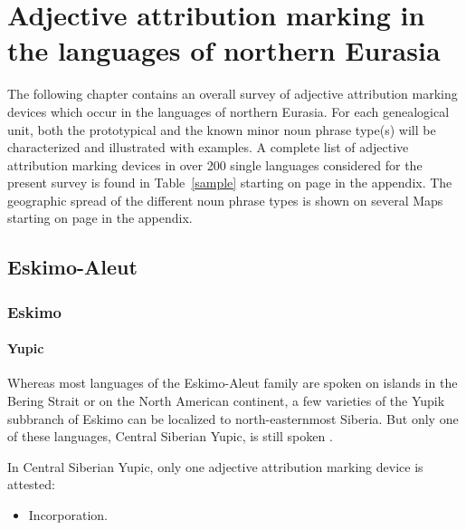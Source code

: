 
\chapter[The languages of northern Eurasia]{Adjective attribution marking in the languages of northern Eurasia}

The following chapter contains an overall survey of adjective attribution marking devices which occur in the languages of northern Eurasia. For each genealogical unit, both the prototypical and the known minor noun phrase type(s) will be characterized and illustrated with examples. A complete list of adjective attribution marking devices in over 200 single languages considered for the present survey is found in Table~\ref{sample} starting on page \pageref{sample} in the appendix. The geographic spread of the different noun phrase types is shown on several Maps starting on page \pageref{WorldMap} in the appendix.

\section{Eskimo-Aleut}

\subsection{Eskimo}

\subsubsection{Yupic}
Whereas most languages of the Eskimo-Aleut family are spoken on islands in the Bering Strait or on the North American continent, a few varieties of the Yupik subbranch of Eskimo can be localized to north-easternmost Siberia. But only one of these languages, Central Siberian Yupic, is still spoken \cite[224]{salminen2007}.

In Central Siberian Yupic, only one adjective attribution marking device is attested:
\begin{itemize}
\item Incorporation.
\end{itemize}

